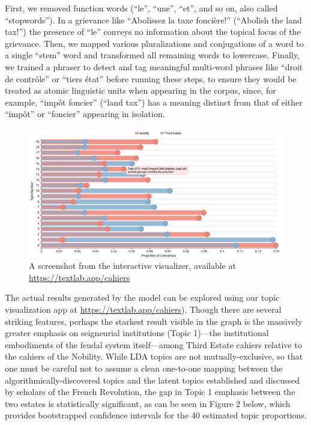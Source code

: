 First, we removed function words (``le'', ``une'', ``et'', and so on, also called ``stopwords''). In a grievance like ``Abolissez la taxe foncière!'' (``Abolish the land tax!'') the presence of ``le'' conveys no information about the topical focus of the grievance. Then, we mapped various pluralizations and conjugations of a word to a single ``stem'' word and transformed all remaining words to lowercase. Finally, we trained a phraser to detect and tag meaningful multi-word phrases like ``droit de contrôle'' or ``tiers état'' before running these steps, to ensure they would be treated as atomic linguistic units when appearing in the corpus, since, for example, ``impôt foncier'' (``land tax'') has a meaning distinct from that of either ``impôt'' or ``foncier'' appearing in isolation.

\begin{figure}
    \centering
    \includegraphics{ch1_figs/topic_viz.png}
    \caption{A screenshot from the interactive visualizer, available at \href{https://textlab.app/cahiers}{https://textlab.app/cahiers}}
    \label{fig:topicviz}
\end{figure}

The actual results generated by the model can be explored using our topic visualization app at \href{https://textlab.app/cahiers}{https://textlab.app/cahiers}). Though there are several striking features, perhaps the starkest result visible in the graph is the massively greater emphasis on seigneurial institutions (Topic 1)---the institutional embodiments of the feudal system itself---among Third Estate cahiers relative to the cahiers of the Nobility. While LDA topics are not mutually-exclusive, so that one must be careful not to assume a clean one-to-one mapping between the algorithmically-discovered topics and the latent topics established and discussed by scholars of the French Revolution, the gap in Topic 1 emphasis between the two estates is statistically significant, as can be seen in Figure 2 below, which provides bootstrapped confidence intervals for the 40 estimated topic proportions.

